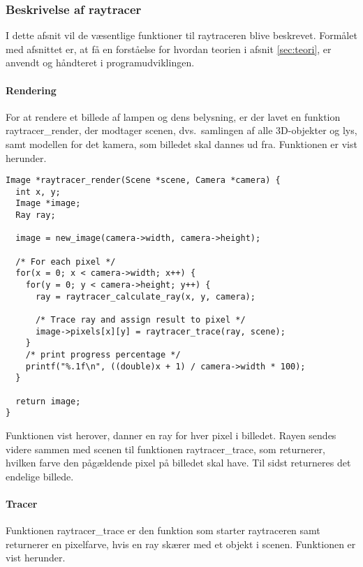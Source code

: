 \subsubsection{Beskrivelse af raytracer}
I dette afsnit vil de væsentlige funktioner til raytraceren blive beskrevet. Formålet med afsnittet er, at få en forståelse for hvordan teorien i afsnit \ref{sec:teori}, er anvendt og håndteret i programudviklingen.


\paragraph{Rendering}
For at rendere et billede af lampen og dens belysning, er der lavet en funktion raytracer\_render, der modtager scenen, dvs.\ samlingen af alle 3D-objekter og lys, samt modellen for det kamera, som billedet skal dannes ud fra. Funktionen er vist herunder.

\begin{lstlisting}[style=Cstyle, caption={Funktionen, der rendere billedet af scenen med et kameras perspektiv}]
Image *raytracer_render(Scene *scene, Camera *camera) {
  int x, y;
  Image *image;
  Ray ray;

  image = new_image(camera->width, camera->height);
  
  /* For each pixel */
  for(x = 0; x < camera->width; x++) {
    for(y = 0; y < camera->height; y++) {
      ray = raytracer_calculate_ray(x, y, camera);

      /* Trace ray and assign result to pixel */
      image->pixels[x][y] = raytracer_trace(ray, scene);
    }
    /* print progress percentage */
    printf("%.1f\n", ((double)x + 1) / camera->width * 100);
  }

  return image;
}
\end{lstlisting}

Funktionen vist herover, danner en ray for hver pixel i billedet. Rayen sendes videre sammen med scenen til funktionen raytracer\_trace, som returnerer, hvilken farve den pågældende pixel på billedet skal have. Til sidst returneres det endelige billede.

\paragraph{Tracer}
Funktionen raytracer\_trace er den funktion som starter raytraceren samt returnerer en pixelfarve, hvis en ray skærer med et objekt i scenen. Funktionen er vist herunder.  

